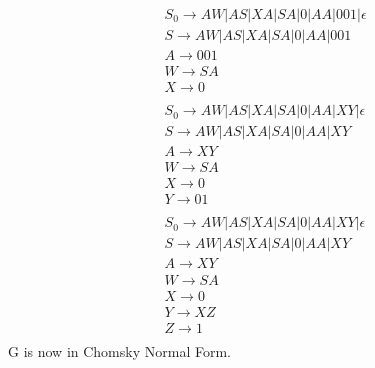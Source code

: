 \documentclass{article}
\begin{document}
\begin{align*}
   & S_0 \rightarrow AW|AS|XA|SA|0|AA|001|\epsilon \\
   & S \rightarrow AW|AS|XA|SA|0|AA|001 \\
   & A \rightarrow 001 \\ 
   & W \rightarrow SA \\
   & X \rightarrow 0 \\\\
   & S_0 \rightarrow AW|AS|XA|SA|0|AA|XY|\epsilon \\
   & S \rightarrow AW|AS|XA|SA|0|AA|XY \\
   & A \rightarrow XY \\ 
   & W \rightarrow SA \\
   & X \rightarrow 0 \\
   & Y \rightarrow 01 \\\\
   & S_0 \rightarrow AW|AS|XA|SA|0|AA|XY|\epsilon \\
   & S \rightarrow AW|AS|XA|SA|0|AA|XY \\
   & A \rightarrow XY \\ 
   & W \rightarrow SA \\
   & X \rightarrow 0 \\
   & Y \rightarrow XZ \\
   & Z \rightarrow 1 \\
\end{align*}
G is now in Chomsky Normal Form.
\end{document}
